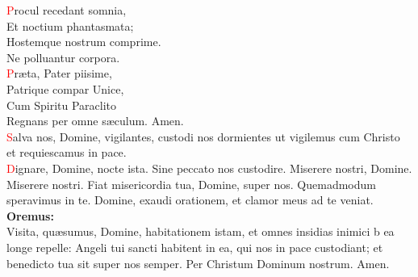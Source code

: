 \documentclass[9pt]{article}
\begin{document}
\begin{multicols*}{2}
      \textcolor{red}{P}rocul recedant somnia,\\
      Et noctium phantasmata;\\
      Hostemque nostrum comprime.\\
      Ne polluantur corpora.\\
      \textcolor{red}{P}r{\ae}ta, Pater piisime,\\
      Patrique compar Unice,\\
      Cum Spiritu Paraclito\\
      Regnans per omne s{\ae}culum. Amen.\\[1mm]
      \textcolor{red}{S}alva nos, Domine, vigilantes, custodi nos dormientes ut vigilemus cum Christo et requiescamus in pace.\\[1mm]
      \textcolor{red}{D}ignare, Domine, nocte ista. Sine peccato nos custodire. Miserere nostri, Domine. Miserere nostri. Fiat misericordia tua,
      Domine, super nos. Quemadmodum speravimus in te. Domine, exaudi orationem, et clamor meus ad te veniat.\\[1mm]
      \textbf{Oremus:}\\
      Visita, qu{\ae}sumus, Domine, habitationem istam, et omnes insidias inimici b ea longe repelle: Angeli tui sancti habitent in ea,
      qui nos in pace custodiant; et benedicto tua sit super nos semper. Per Christum Dominum nostrum. Amen.


\end{multicols*}
\end{document}
